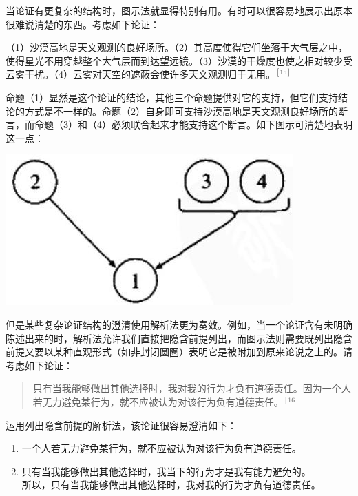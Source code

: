 当论证有更复杂的结构时，图示法就显得特别有用。有时可以很容易地展示出原本很难说清楚的东西。考虑如下论证：

\begin{displayquote}
（1）沙漠高地是天文观测的良好场所。（2）其高度使得它们坐落于大气层之中，使得星光不用穿越整个大气层而到达望远镜。（3）沙漠的干燥度也使之相对较少受云雾干扰。（4）云雾对天空的遮蔽会使许多天文观测归于无用。${}^{[15]}$
\end{displayquote}

命题（1）显然是这个论证的结论，其他三个命题提供对它的支持，但它们支持结论的方式是不一样的。命题（2）自身即可支持沙漠高地是天文观测良好场所的断言，而命题（3）和（4）必须联合起来才能支持这个断言。如下图示可清楚地表明这一点：

\begin{center}
\includegraphics[width=\textwidth]{images/2025_05_15_6a28331d5e7c993ad07ag-031.jpg}
\end{center}

但是某些复杂论证结构的澄清使用解析法更为奏效。例如，当一个论证含有未明确陈述出来的时，解析法允许我们直接把隐含前提列出，而图示法则需要既列出隐含前提又要以某种直观形式（如非封闭圆圈）表明它是被附加到原来论说之上的。请考虑如下论证：

\begin{quotation}
只有当我能够做出其他选择时，我对我的行为才负有道德责任。因为一个人若无力避免某行为，就不应被认为对该行为负有道德责任。${}^{[16]}$
\end{quotation}

运用列出隐含前提的解析法，该论证很容易澄清如下：

\begin{enumerate}
  \item 一个人若无力避免某行为，就不应被认为对该行为负有道德责任。
  \item 只有当我能够做出其他选择时，我当下的行为才是我有能力避免的。\\
  所以，只有当我能够做出其他选择时，我对我的行为才负有道德责任。
\end{enumerate}


